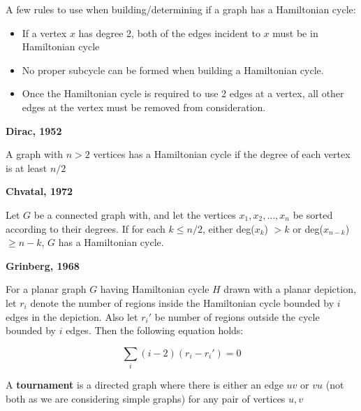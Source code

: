 \documentclass[10pt]{article}
\begin{document}
A few rules to use when building/determining if a graph has a Hamiltonian cycle:

\begin{itemize}
    \item If a vertex $x$ has degree 2, both of the edges incident to $x$ must be in Hamiltonian cycle
    \item No proper subcycle can be formed when building a Hamiltonian cycle. 
    \item Once the Hamiltonian cycle is required to use 2 edges at a vertex, all other edges at the vertex must be removed from consideration.
\end{itemize}

\begin{theorem}
    \textbf{Dirac, 1952}

    A graph with $n>2$ vertices has a Hamiltonian cycle if the degree of each vertex is at least $n/2$ 
\end{theorem}

\begin{theorem}
    \textbf{Chvatal, 1972}

    Let $G$ be a connected graph with, and let the vertices $x_1, x_2, \ldots, x_n$ be sorted according to their degrees. If for each $k \leq n / 2$, either deg($x_k$) $> k$ or deg($x_{n-k}$) $\geq n - k$, $G$ has a Hamiltonian cycle.
\end{theorem}

\begin{theorem}
    \textbf{Grinberg, 1968}

    For a planar graph $G$ having Hamiltonian cycle $H$ drawn with a planar depiction, let $r_i$ denote the number of regions inside the Hamiltonian cycle bounded by $i$ edges in the depiction. Also let $r_i'$ be number of regions outside the cycle bounded by $i$ edges. Then the following equation holds:

    \begin{equation}
        \sum_i (i-2)(r_i - r_i') = 0
    \end{equation}
\end{theorem}

\vspace{3em}

\begin{definition}
    A \textbf{tournament} is a directed graph where there is either an edge $uv$ or $vu$ (not both as we are considering simple graphs) for any pair of vertices $u,v$
\end{definition}
\end{document}
